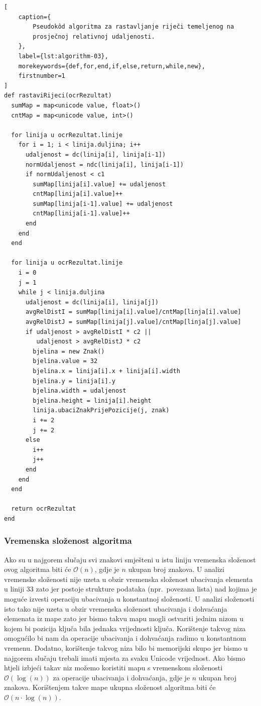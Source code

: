 \documentclass[times, utf8, zavrsni]{fer}
\begin{document}
\begin{lstlisting}[
    caption={
        Pseudokôd algoritma za rastavljanje riječi temeljenog na
        prosječnoj relativnoj udaljenosti.
    },
    label={lst:algorithm-03},
    morekeywords={def,for,end,if,else,return,while,new},
    firstnumber=1
]
def rastaviRijeci(ocrRezultat)
  sumMap = map<unicode value, float>()
  cntMap = map<unicode value, int>()

  for linija u ocrRezultat.linije
    for i = 1; i < linija.duljina; i++
      udaljenost = dc(linija[i], linija[i-1])
      normUdaljenost = ndc(linija[i], linija[i-1])
      if normUdaljenost < c1
        sumMap[linija[i].value] += udaljenost
        cntMap[linija[i].value]++
        sumMap[linija[i-1].value] += udaljenost
        cntMap[linija[i-1].value]++
      end
    end
  end

  for linija u ocrRezultat.linije
    i = 0
    j = 1
    while j < linija.duljina
      udaljenost = dc(linija[i], linija[j])
      avgRelDistI = sumMap[linija[i].value]/cntMap[linja[i].value]
      avgRelDistJ = sumMap[linija[j].value]/cntMap[linja[j].value]
      if udaljenost > avgRelDistI * c2 ||
         udaljenost > avgRelDistJ * c2
        bjelina = new Znak()
        bjelina.value = 32
        bjelina.x = linija[i].x + linija[i].width
        bjelina.y = linija[i].y
        bjelina.width = udaljenost
        bjelina.height = linija[i].height
        linija.ubaciZnakPrijePozicije(j, znak)
        i += 2
        j += 2
      else
        i++
        j++
      end
    end
  end

  return ocrRezultat
end
\end{lstlisting}


\subsubsection{Vremenska složenost algoritma}
Ako su u najgorem slučaju svi znakovi smješteni u istu liniju vremenska
složenost ovog algoritma biti će $\mathcal{O}(n)$, gdje je $n$ ukupan broj
znakova. U analizi vremenske složenosti nije uzeta u obzir vremenska složenost
ubacivanja elementa u liniji $33$ zato jer postoje strukture podataka
(npr.\ povezana lista) nad kojima je moguće izvesti operaciju ubacivanja u
konstantnoj složenosti. U analizi složenosti isto tako nije uzeta u obzir
vremenska složenost ubacivanja i dohvaćanja elemenata iz mape zato jer bismo
takvu mapu mogli ostvariti jednim nizom u kojem bi pozicija ključa bila jednaka
vrijednosti ključa. Korištenje takvog niza omogućilo bi nam da operacije
ubacivanja i dohvaćanja radimo u konstantnom vremenu. Dodatno, korištenje
takvog niza bilo bi memorijski skupo jer bismo u najgorem slučaju trebali imati
mjesta za svaku Unicode vrijednost. Ako bismo htjeli izbjeći takav niz možemo
koristiti mapu s vremenskom složenosti $\mathcal{O}(\log(n))$ za operacije
ubacivanja i dohvaćanja, gdje je $n$ ukupan broj znakova. Korištenjem takve
mape ukupna složenost algoritma biti će $\mathcal{O}(n \cdot \log(n))$.
\end{document}
